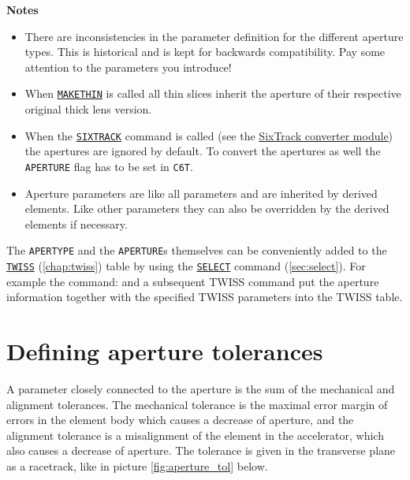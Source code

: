 {\bf Notes}
\begin{itemize}
   \item There are inconsistencies in the parameter definition for the
     different aperture types. This is historical and is kept for
     backwards compatibility. Pay some attention to the parameters you
     introduce! 
   \item When \hyperref[chap:makethin]{\tt MAKETHIN} is called all
     thin slices inherit the aperture of their respective original thick
     lens version.  
   \item When the \hyperref[chap:c6t]{\tt SIXTRACK} command is 
   called (see the
     \hyperref[chap:sixtrack]{SixTrack converter module}) the apertures are
     ignored by default. To convert the apertures as well the {\tt APERTURE}
     flag has to be set in {\tt C6T}.  
   \item  Aperture parameters are like all parameters and are inherited
     by derived elements. Like other parameters they can also be overridden by
     the derived elements if necessary.  
\end{itemize}

The \texttt{APERTYPE} and the \texttt{APERTURE}s themselves can be
conveniently added to the \hyperref[chap:twiss]{\texttt{TWISS}}
(\autoref{chap:twiss}) table by 
using the 
\hyperref[sec:select]{\tt SELECT} command (\autoref{sec:select}). 
For example the command:    
and a subsequent TWISS command put the aperture information
together with the specified TWISS parameters into the TWISS table.

\section{Defining aperture tolerances}
\label{sec:apertol}
A parameter closely connected to the aperture is the sum of the
mechanical and alignment tolerances. The mechanical tolerance is 
the maximal error margin of errors in the element body which 
causes a decrease of aperture, and the alignment tolerance is a 
misalignment of the element in the accelerator, which also causes a 
decrease of aperture. The tolerance is given in the transverse plane 
as a racetrack, like in picture \ref{fig:aperture_tol} below. 

